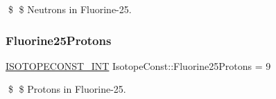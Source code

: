 \$ \$ Neutrons in Fluorine-\/25. \mbox{\label{group___isotope_const-_fluorine-_f25_gaa362d9a414d6772951c10a06b19c8191}} 
\subsubsection{\texorpdfstring{Fluorine25\+Protons}{Fluorine25Protons}}
{\footnotesize\ttfamily \mbox{\hyperlink{group___isotope_const-_macros_ga5f18360b3e99483a35c32d789e62621c}{I\+S\+O\+T\+O\+P\+E\+C\+O\+N\+S\+T\+\_\+\+I\+NT}} Isotope\+Const\+::\+Fluorine25\+Protons = 9}

\$ \$ Protons in Fluorine-\/25. 